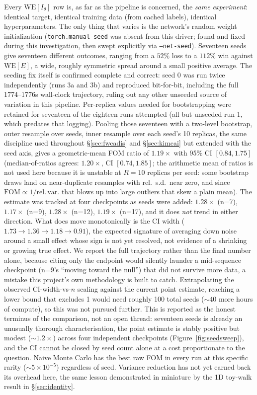 \documentclass[11pt]{article}
\begin{document}
	Every $\mathrm{WE}[I_\theta]$ row is, as far as the pipeline is concerned, the
	\emph{same experiment}: identical target, identical training data (from cached labels),
	identical hyperparameters. The only thing that varies is the network's random weight
	initialization (\texttt{torch.manual\_seed} was absent from this driver; found and
	fixed during this investigation, then swept explicitly via \texttt{--net-seed}).
	Seventeen seeds give seventeen different outcomes, ranging from a $52\%$ loss to
		a $112\%$ win against $\mathrm{WE}[E]$, a wide, roughly symmetric spread around a
	small positive average. The seeding fix itself is confirmed complete and correct: seed
	0 was run twice independently (runs 3a and 3b) and reproduced bit-for-bit, including the
	full 1774--1776s wall-clock trajectory, ruling out any other unseeded source of
	variation in this pipeline. Per-replica values needed for bootstrapping were retained
	for seventeen of the eighteen runs attempted (all but unseeded run 1, which predates that
	logging).
	Pooling those seventeen with a two-level bootstrap, outer resample over seeds,
	inner resample over each seed's 10 replicas, the same discipline used throughout
	\S\ref{sec:fwcadis} and \S\ref{sec:kimcai} but extended with the seed axis, gives a
	geometric-mean FOM ratio of $1.19\times$ with 95\% CI $[0.84, 1.75]$ (median-of-ratios
	agrees: $1.20\times$, CI $[0.74, 1.85]$; the arithmetic mean of ratios is not used here
	because it is unstable at $R=10$ replicas per seed: some bootstrap draws land on
	near-duplicate resamples with rel.\ s.d.\ near zero, and since $\mathrm{FOM}\propto
	1/\mathrm{rel.\,var.}$ that blows up into large outliers that skew a plain mean).
	The estimate was tracked at four checkpoints as seeds were added: $1.28\times$
	(n=7), $1.17\times$ (n=9), $1.28\times$ (n=12), $1.19\times$ (n=17), and it does
	\emph{not} trend in either direction. What does move monotonically is the CI width
	($1.73\to1.36\to1.18\to0.91$), the expected signature of averaging down noise around a
	small effect whose sign is not yet resolved, not evidence of a shrinking or growing true
	effect. We report the full trajectory rather than the final number alone, because citing
	only the endpoint would silently launder a mid-sequence checkpoint (n=9's ``moving
	toward the null'') that did not survive more data, a mistake this project's own
	methodology is built to catch.
	Extrapolating the observed CI-width-vs-$n$ scaling against the current point
		estimate, reaching a lower bound that excludes 1 would need roughly 100 total seeds
		($\sim\!40$ more hours of compute), so this was not pursued further. This is reported as
	the honest terminus of the comparison, not an open
	thread: seventeen seeds is already an unusually thorough characterisation, the point
	estimate is stably positive but modest ($\sim\!1.2\times$) across four independent
	checkpoints (Figure~\ref{fig:seedsweep}), and the CI cannot be closed by seed count alone
	at a cost proportionate to
	the question. Naive Monte Carlo has the best raw FOM in every run
	at this specific rarity ($\sim\!5\times10^{-5}$) regardless of seed. Variance
	reduction has not yet earned back its overhead here, the same lesson demonstrated in
	miniature by the 1D toy-walk result in \S\ref{sec:identity}.
\end{document}
